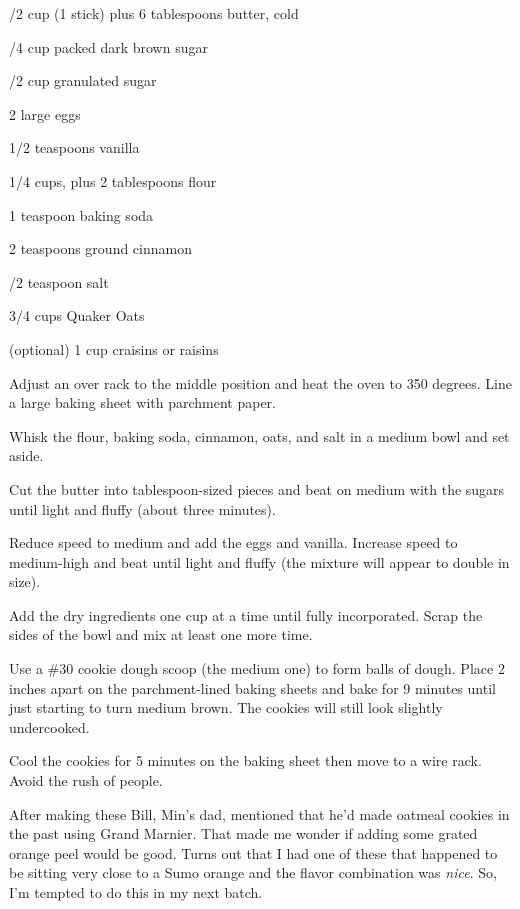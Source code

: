 \begin{IngredientsAndSteps}
    \ListIngredientsAndSteps
    {
        /2 cup (1 stick) plus 6 tablespoons butter, cold

        /4 cup packed dark brown sugar

        /2 cup granulated sugar

        2 large eggs

        1/2 teaspoons vanilla

        1/4 cups, plus 2 tablespoons flour

        1 teaspoon baking soda

        2 teaspoons ground cinnamon

        /2 teaspoon salt

        3/4 cups Quaker Oats

        (optional) 1 cup craisins or raisins
    }
    {
        Adjust an over rack to the middle position and heat the oven to 350 degrees. Line a large baking sheet
        with parchment paper.

        Whisk the flour, baking soda, cinnamon, oats, and salt in a medium bowl and set aside.

        Cut the butter into tablespoon-sized pieces and beat on medium with the sugars until light and fluffy
        (about three minutes).

        Reduce speed to medium and add the eggs and vanilla. Increase speed to medium-high and beat until
        light and fluffy (the mixture will appear to double in size).

        Add the dry ingredients one cup at a time until fully incorporated. Scrap the sides of the
        bowl and mix at least one more time.

        Use a \#30 cookie dough scoop (the medium one) to form balls of dough.
        Place 2 inches apart on the parchment-lined baking sheets and bake for 9 minutes until just starting
        to turn medium brown. The cookies will still look slightly undercooked.

        Cool the cookies for 5 minutes on the baking sheet then move to a wire rack. Avoid the rush of people.
    }
\end{IngredientsAndSteps}

\begin{Tip}
    {After making these Bill, Min's dad, mentioned that he'd made oatmeal cookies in the past using
        Grand Marnier. That made me wonder if adding some grated orange peel would be good. Turns out that
        I had one of these that happened to be sitting very close to a Sumo orange and the flavor
        combination was \emph{nice}. So, I'm tempted to do this in my next batch.}
\end{Tip}

